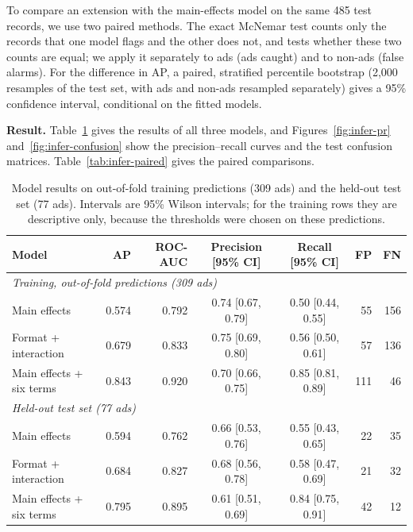 To compare an extension with the main-effects model on the same 485 test
records, we use two paired methods. The exact McNemar test counts only the
records that one model flags and the other does not, and tests whether these
two counts are equal; we apply it separately to ads (ads caught) and to
non-ads (false alarms). For the difference in AP, a paired, stratified
percentile bootstrap (2,000 resamples of the test set, with ads and non-ads
resampled separately) gives a 95\% confidence interval, conditional on the
fitted models.

\textbf{Result.} Table~\ref{tab:infer-models} gives the results of all three
models, and Figures~\ref{fig:infer-pr} and~\ref{fig:infer-confusion} show the
precision--recall curves and the test confusion matrices.
Table~\ref{tab:infer-paired} gives the paired comparisons.

\begin{table}[htbp]
\centering
\small
\setlength{\tabcolsep}{4pt}
\caption{Model results on out-of-fold training predictions (309 ads) and the held-out test set (77 ads). Intervals are 95\% Wilson intervals; for the training rows they are descriptive only, because the thresholds were chosen on these predictions.}
\label{tab:infer-models}
\begin{tabular}{lrrccrr}
\toprule
Model & AP & ROC-AUC & Precision [95\% CI] & Recall [95\% CI] & FP & FN\\
\midrule
\multicolumn{7}{l}{\emph{Training, out-of-fold predictions (309 ads)}}\\
Main effects & 0.574 & 0.792 & 0.74 [0.67, 0.79] & 0.50 [0.44, 0.55] & 55 & 156\\
Format + interaction & 0.679 & 0.833 & 0.75 [0.69, 0.80] & 0.56 [0.50, 0.61] & 57 & 136\\
Main effects + six terms & 0.843 & 0.920 & 0.70 [0.66, 0.75] & 0.85 [0.81, 0.89] & 111 & 46\\
\midrule
\multicolumn{7}{l}{\emph{Held-out test set (77 ads)}}\\
Main effects & 0.594 & 0.762 & 0.66 [0.53, 0.76] & 0.55 [0.43, 0.65] & 22 & 35\\
Format + interaction & 0.684 & 0.827 & 0.68 [0.56, 0.78] & 0.58 [0.47, 0.69] & 21 & 32\\
Main effects + six terms & 0.795 & 0.895 & 0.61 [0.51, 0.69] & 0.84 [0.75, 0.91] & 42 & 12\\
\bottomrule
\end{tabular}
\end{table}

